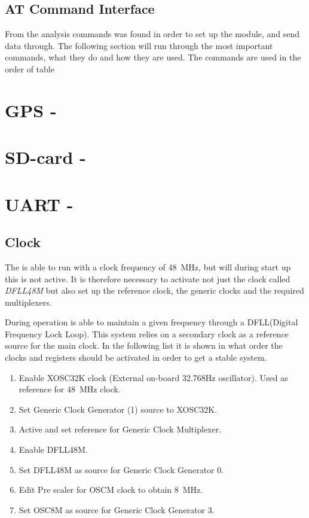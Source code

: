 \subsection{AT Command Interface}
From the analysis commands was found in order to set up the module, and send data through. The following section will run through the most important commands, what they do and how they are used. The commands are used in the order of table 

\section{GPS - \GPS}





\section{SD-card - \SDsock}


\section{UART - \SAMD}

\subsection{Clock}
The \SAMD is able to run with a clock frequency of \SI{48}{\mega\hertz}, but will during start up this is not active.
It is therefore necessary to activate not just the clock called \textit{DFLL48M} but also set up the reference clock, the generic clocks and the required multiplexers.

During operation \SAMD is able to maintain a given frequency through a DFLL(Digital Frequency Lock Loop).
This system relies on a secondary clock as a reference source for the main clock.
In the following list it is shown in what order the clocks and registers should be activated in order to get a stable system.

\begin{enumerate}
	\item Enable XOSC32K clock (External on-board 32.768Hz oscillator). Used as reference for \SI{48}{\mega\hertz} clock.
	\item Set Generic Clock Generator (1) source to XOSC32K.
	\item Active and set reference for Generic Clock Multiplexer.
	\item Enable DFLL48M.
	\item Set DFLL48M as source for Generic Clock Generator 0.
	\item Edit Pre scaler for OSCM clock to obtain \SI{8}{\mega\hertz}.
	\item Set OSC8M as source for Generic Clock Generator 3.
\end{enumerate} 

